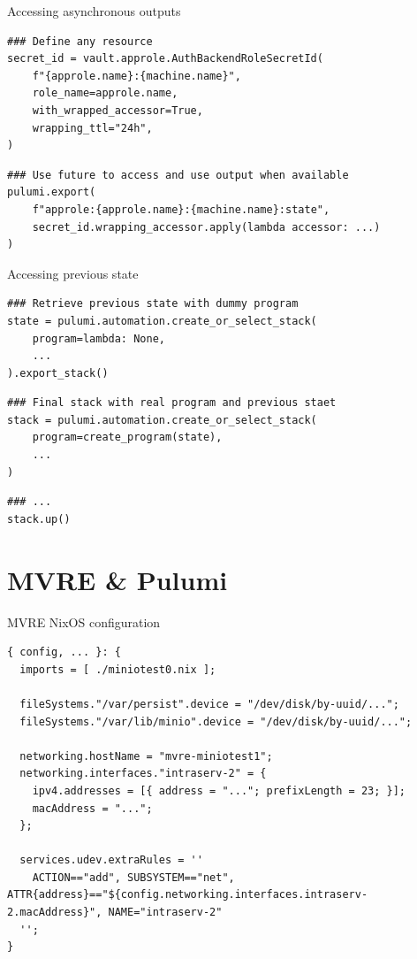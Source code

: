 \documentclass[12pt,aspectratio=169]{beamer}
\begin{document}
\begin{frame}[fragile]{Accessing asynchronous outputs}
\footnotesize
\begin{verbatim}
### Define any resource
secret_id = vault.approle.AuthBackendRoleSecretId(
    f"{approle.name}:{machine.name}",
    role_name=approle.name,
    with_wrapped_accessor=True,
    wrapping_ttl="24h",
)
\end{verbatim}
\begin{verbatim}
### Use future to access and use output when available
pulumi.export(
    f"approle:{approle.name}:{machine.name}:state",
    secret_id.wrapping_accessor.apply(lambda accessor: ...)
)
\end{verbatim}
\end{frame}

\begin{frame}[fragile]{Accessing previous state}
\footnotesize
\begin{verbatim}
### Retrieve previous state with dummy program
state = pulumi.automation.create_or_select_stack(
    program=lambda: None,
    ...
).export_stack()
\end{verbatim}
\begin{verbatim}
### Final stack with real program and previous staet
stack = pulumi.automation.create_or_select_stack(
    program=create_program(state),
    ...
)
\end{verbatim}
\begin{verbatim}
### ...
stack.up()
\end{verbatim}
\end{frame}

\section{MVRE \& Pulumi}

\begin{frame}[fragile]{MVRE NixOS configuration}
\footnotesize
\begin{verbatim}
{ config, ... }: {
  imports = [ ./miniotest0.nix ];

  fileSystems."/var/persist".device = "/dev/disk/by-uuid/...";
  fileSystems."/var/lib/minio".device = "/dev/disk/by-uuid/...";

  networking.hostName = "mvre-miniotest1";
  networking.interfaces."intraserv-2" = {
    ipv4.addresses = [{ address = "..."; prefixLength = 23; }];
    macAddress = "...";
  };

  services.udev.extraRules = ''
    ACTION=="add", SUBSYSTEM=="net", ATTR{address}=="${config.networking.interfaces.intraserv-2.macAddress}", NAME="intraserv-2"
  '';
}
\end{verbatim}
\end{frame}
\end{document}
